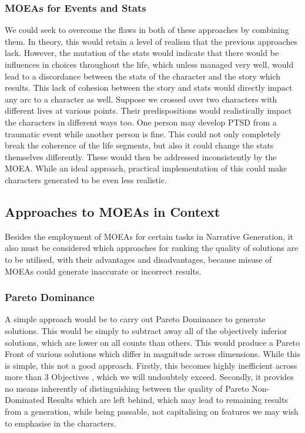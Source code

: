 \documentclass[12pt]{article}
\begin{document}
\subsubsection{MOEAs for Events and Stats} 
We could seek to overcome the flaws in both of these approaches by combining them. In theory, this would retain a level of realism that the previous approaches lack. However, the mutation of the stats would indicate that there would be influences in choices throughout the life, which unless managed very well, would lead to a discordance between the stats of the character and the story which results. This lack of cohesion between the story and stats would directly impact any arc to a character as well. Suppose we crossed over two characters with different lives at various points. Their predispositions would realistically impact the characters in different ways too. One person may develop PTSD from a traumatic event while another person is fine. This could not only completely break the coherence of the life segments, but also it could change the stats themselves differently. These would then be addressed inconsistently by the MOEA. While an ideal approach, practical implementation of this could make characters generated to be even less realistic. \\

\subsection{Approaches to MOEAs in Context}
Besides the employment of MOEAs for certain tasks in Narrative Generation, it also must be considered which approaches for ranking the quality of solutions are to be utilised, with their advantages and disadvantages, because misuse of MOEAs could generate inaccurate or incorrect results.
\subsubsection{Pareto Dominance}
A simple approach would be to carry out Pareto Dominance to generate solutions. This would be simply to subtract away all of the objectively inferior solutions, which are lower on all counts than others. This would produce a Pareto Front of various solutions which differ in magnitude across dimensions. While this is simple, this not a good approach. Firstly, this becomes highly inefficient across more than 3 Objectives \cite{AchievementScalarazingIndicatorBased}, which we will undoubtely exceed. Secondly, it provides no means inherently of distinguishing between the quality of Pareto Non-Dominated Results which are left behind, which may lead to remaining results from a generation, while being passable, not capitalising on features we may wish to emphasise in the characters.  
\end{document}
